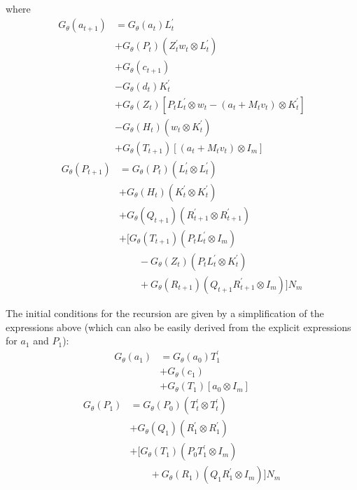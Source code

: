 \documentclass[12pt]{article}
\newcommand{\Gt}{G_\theta}
\begin{document}
	where 
	\begin{align*}
	\Gt(a_{t+1}) &= \Gt(a_t)L_t^\prime \\ 	
	 &+ \Gt(P_t) (Z_t^\prime w_t \otimes L_t^\prime) \\
	 &+ \Gt(c_{t+1}) \\
	 &- \Gt(d_t) K_t^\prime \\ 
	 &+ \Gt(Z_t) [P_tL_t^\prime \otimes w_t - (a_t + M_t v_t) \otimes K_t^\prime] \\
	 &- \Gt(H_t) (w_t \otimes K_t^\prime) \\ 
	 &+ \Gt(T_{t+1})[(a_t + M_t v_t) \otimes I_m]
	\end{align*}
	\begin{align*}
	\Gt(P_{t+1}) &= \Gt(P_t) (L_t^\prime \otimes L_t^\prime) \\
	 &+ \Gt(H_t)(K_t^\prime \otimes K_t^\prime) \\
	 &+ \Gt(Q_{t+1})(R_{t+1}^\prime \otimes R_{t+1}^\prime) \\
	 &+ [\Gt(T_{t+1})(P_t L_t^\prime \otimes I_m) \\
	 &\qquad - \Gt(Z_t)(P_t L_t^\prime \otimes K_t^\prime) \\
	 &\qquad + \Gt(R_{t+1})(Q_{t+1}R_{t+1}^\prime \otimes I_m) ] N_m
	\end{align*}


	The initial conditions for the recursion are given by a simplification of the expressions above (which can also be easily derived from the explicit expressions for $a_1$ and $P_1$): 
	\begin{align*}
	\Gt(a_1) &= \Gt(a_0) T_1^\prime \\ 
	 &+ \Gt(c_1)  \\
	 &+ \Gt(T_1)[a_0 \otimes I_m]
	\end{align*}
	\begin{align*}
	\Gt(P_1) &= \Gt(P_0) (T_t^\prime \otimes T_t^\prime) \\
	 &+ \Gt(Q_1)(R_1^\prime \otimes R_1^\prime) \\
	 &+ [\Gt(T_1)(P_0 T_1^\prime \otimes I_m) \\
	 &\qquad + \Gt(R_1)(Q_1 R_1^\prime \otimes I_m) ] N_m
	\end{align*}
\end{document}
